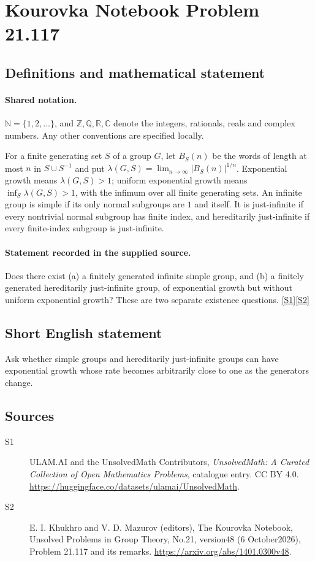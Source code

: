 \documentclass[11pt]{article}
\newcommand{\sref}[2]{\hyperlink{source:#1:#2}{[S#2]}}
\begin{document}
\section{Kourovka Notebook Problem 21.117}\label{statement}

\subsection{Definitions and mathematical statement}

\paragraph{Shared notation.}$\mathbb N=\{1,2,\ldots\}$, and $\mathbb Z,\mathbb Q,\mathbb R,\mathbb C$ denote the integers, rationals, reals and complex numbers. Any other conventions are specified locally.


For a finite generating set $S$ of a group $G$, let $B_S(n)$ be the words of length at most $n$ in $S\cup S^{-1}$ and put $\lambda(G,S)=\lim_{n\to\infty}|B_S(n)|^{1/n}$. Exponential growth means $\lambda(G,S)>1$; uniform exponential growth means $\inf_S\lambda(G,S)>1$, with the infimum over all finite generating sets. An infinite group is simple if its only normal subgroups are $1$ and itself. It is just-infinite if every nontrivial normal subgroup has finite index, and hereditarily just-infinite if every finite-index subgroup is just-infinite.
\paragraph{Statement recorded in the supplied source.}
Does there exist (a) a finitely generated infinite simple group, and (b) a finitely generated hereditarily just-infinite group, of exponential growth but without uniform exponential growth? These are two separate existence questions. \sref{statement}{1}\sref{statement}{2}
\subsection{Short English statement}
Ask whether simple groups and hereditarily just-infinite groups can have exponential growth whose rate becomes arbitrarily close to one as the generators change.
\subsection{Sources}
\begin{description}
\item[\hypertarget{source:statement:1}{S1}] ULAM.AI and the UnsolvedMath Contributors, \emph{UnsolvedMath: A Curated Collection of Open Mathematics Problems}, catalogue entry. CC BY 4.0. \url{https://huggingface.co/datasets/ulamai/UnsolvedMath}.
\item[\hypertarget{source:statement:2}{S2}] E. I. Khukhro and V. D. Mazurov (editors), The Kourovka Notebook, Unsolved Problems in Group Theory, No.21, version48 (6 October2026), Problem 21.117 and its remarks. \url{https://arxiv.org/abs/1401.0300v48}.
\end{description}
\label{end:statement}
\end{document}
